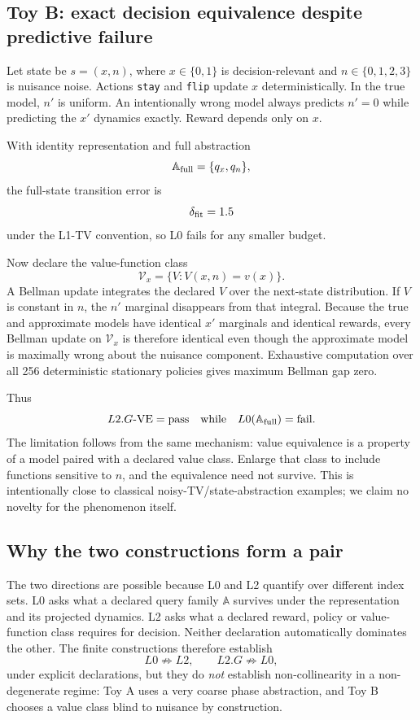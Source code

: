 \documentclass[10pt]{article}
\newcommand{\Aabs}{\mathbb A}
\begin{document}
\subsection{Toy B: exact decision equivalence despite predictive failure}

Let state be $s=(x,n)$, where $x\in\{0,1\}$ is decision-relevant and $n\in\{0,1,2,3\}$ is nuisance noise. Actions \texttt{stay} and \texttt{flip} update $x$ deterministically. In the true model, $n'$ is uniform. An intentionally wrong model always predicts $n'=0$ while predicting the $x'$ dynamics exactly. Reward depends only on $x$.

With identity representation and full abstraction
\[
\Aabs_{\rm full}=\{q_x,q_n\},
\]
the full-state transition error is
\[
\delta_{\rm fit}=1.5
\]
under the L1-TV convention, so L0 fails for any smaller budget.

Now declare the value-function class
\[
\mathcal V_x=\{V:V(x,n)=v(x)\}.
\]
A Bellman update integrates the declared $V$ over the next-state distribution. If $V$ is constant in $n$, the $n'$ marginal disappears from that integral. Because the true and approximate models have identical $x'$ marginals and identical rewards, every Bellman update on $\mathcal V_x$ is therefore identical even though the approximate model is maximally wrong about the nuisance component. Exhaustive computation over all 256 deterministic stationary policies gives maximum Bellman gap zero.

Thus
\[
L2.G\text{-VE}=\text{pass}
\quad\text{while}\quad
L0(\Aabs_{\rm full})=\text{fail}.
\]
The limitation follows from the same mechanism: value equivalence is a property of a model paired with a declared value class. Enlarge that class to include functions sensitive to $n$, and the equivalence need not survive. This is intentionally close to classical noisy-TV/state-abstraction examples; we claim no novelty for the phenomenon itself.

\subsection{Why the two constructions form a pair}

The two directions are possible because L0 and L2 quantify over different index sets. L0 asks what a declared query family $\Aabs$ survives under the representation and its projected dynamics. L2 asks what a declared reward, policy or value-function class requires for decision. Neither declaration automatically dominates the other. The finite constructions therefore establish
\[
L0\not\Rightarrow L2,
\qquad
L2.G\not\Rightarrow L0,
\]
under explicit declarations, but they do \emph{not} establish non-collinearity in a non-degenerate regime: Toy A uses a very coarse phase abstraction, and Toy B chooses a value class blind to nuisance by construction.
\end{document}
